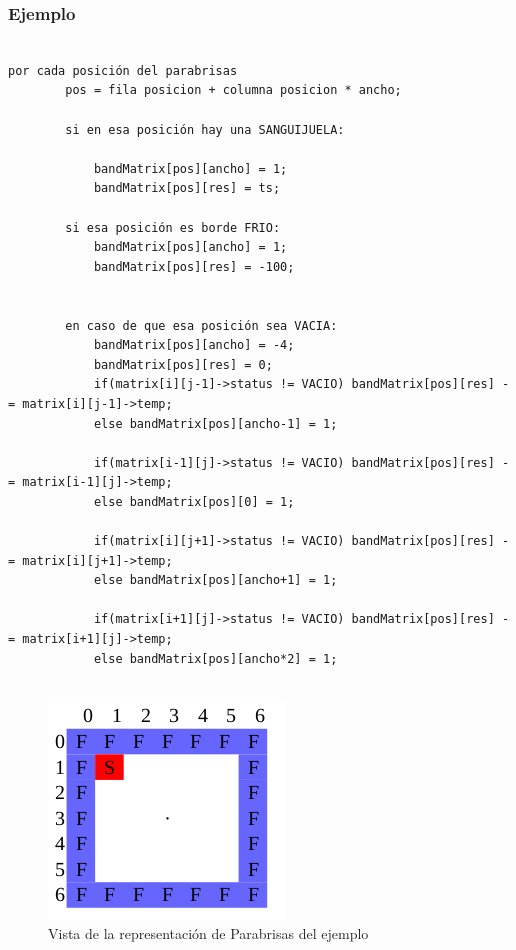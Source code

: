 \subsubsection{Ejemplo}
\begin{verbatim}

por cada posición del parabrisas
		pos = fila posicion + columna posicion * ancho;
		
		si en esa posición hay una SANGUIJUELA:
			
			bandMatrix[pos][ancho] = 1;
			bandMatrix[pos][res] = ts;
		
		si esa posición es borde FRIO:
			bandMatrix[pos][ancho] = 1;
			bandMatrix[pos][res] = -100;


		en caso de que esa posición sea VACIA:
			bandMatrix[pos][ancho] = -4;
			bandMatrix[pos][res] = 0;
			if(matrix[i][j-1]->status != VACIO) bandMatrix[pos][res] -= matrix[i][j-1]->temp;
			else bandMatrix[pos][ancho-1] = 1;

			if(matrix[i-1][j]->status != VACIO) bandMatrix[pos][res] -= matrix[i-1][j]->temp;
			else bandMatrix[pos][0] = 1;

			if(matrix[i][j+1]->status != VACIO) bandMatrix[pos][res] -= matrix[i][j+1]->temp;
			else bandMatrix[pos][ancho+1] = 1;

			if(matrix[i+1][j]->status != VACIO) bandMatrix[pos][res] -= matrix[i+1][j]->temp;
			else bandMatrix[pos][ancho*2] = 1;
		

\end{verbatim}
\begin{figure}[htb]
\begin{center}
\includegraphics[scale=0.70]{imagenes/parabrisasej.png} 
\caption{Vista de la representación de Parabrisas del ejemplo} 
\end{center}
\end{figure}

